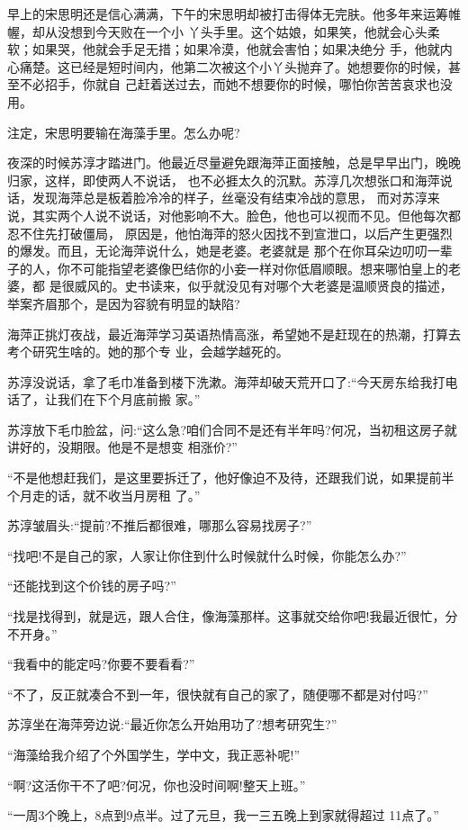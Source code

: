 \documentclass[11pt,a4paper,onecolumn]{article}
\begin{document}
早上的宋思明还是信心满满，下午的宋思明却被打击得体无完肤。他多年来运筹帷幄，却从没想到今天败在一个小
丫头手里。这个姑娘，如果笑，他就会心头柔软；如果哭，他就会手足无措；如果冷漠，他就会害怕；如果决绝分
手，他就内心痛楚。这已经是短时间内，他第二次被这个小丫头抛弃了。她想要你的时候，甚至不必招手，你就自
己赶着送过去，而她不想要你的时候，哪怕你苦苦哀求也没用。

注定，宋思明要输在海藻手里。怎么办呢?

夜深的时候苏淳才踏进门。他最近尽量避免跟海萍正面接触，总是早早出门，晚晚归家，这样，即使两人不说话，
也不必捱太久的沉默。苏淳几次想张口和海萍说话，发现海萍总是板着脸冷冷的样子，丝毫没有结束冷战的意思，
而对苏淳来说，其实两个人说不说话，对他影响不大。脸色，他也可以视而不见。但他每次都忍不住先打破僵局，
原因是，他怕海萍的怒火因找不到宣泄口，以后产生更强烈的爆发。而且，无论海萍说什么，她是老婆。老婆就是
那个在你耳朵边叨叨一辈子的人，你不可能指望老婆像巴结你的小妾一样对你低眉顺眼。想来哪怕皇上的老婆，都
是很威风的。史书读来，似乎就没见有对哪个大老婆是温顺贤良的描述，举案齐眉那个，是因为容貌有明显的缺陷?

海萍正挑灯夜战，最近海萍学习英语热情高涨，希望她不是赶现在的热潮，打算去考个研究生啥的。她的那个专
业，会越学越死的。

苏淳没说话，拿了毛巾准备到楼下洗漱。海萍却破天荒开口了:``今天房东给我打电话了，让我们在下个月底前搬
家。''

苏淳放下毛巾脸盆，问:``这么急?咱们合同不是还有半年吗?何况，当初租这房子就讲好的，没期限。他是不是想变
相涨价?''

``不是他想赶我们，是这里要拆迁了，他好像迫不及待，还跟我们说，如果提前半个月走的话，就不收当月房租
了。''

苏淳皱眉头:``提前?不推后都很难，哪那么容易找房子?''

``找吧!不是自己的家，人家让你住到什么时候就什么时候，你能怎么办?''

``还能找到这个价钱的房子吗?''

``找是找得到，就是远，跟人合住，像海藻那样。这事就交给你吧!我最近很忙，分不开身。''

``我看中的能定吗?你要不要看看?''

``不了，反正就凑合不到一年，很快就有自己的家了，随便哪不都是对付吗?''

苏淳坐在海萍旁边说:``最近你怎么开始用功了?想考研究生?''

``海藻给我介绍了个外国学生，学中文，我正恶补呢!''

``啊?这活你干不了吧?何况，你也没时间啊!整天上班。''

``一周3个晚上，8点到9点半。过了元旦，我一三五晚上到家就得超过 11点了。''
\end{document}
